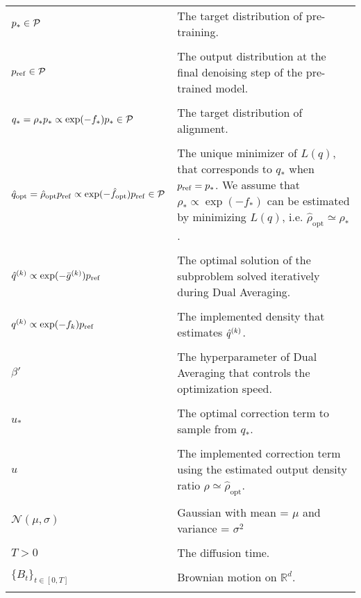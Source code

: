 \begin{longtable}{|>{\raggedright\arraybackslash}p{3cm}|>{\raggedright\arraybackslash}p{9cm}|}
$p_*\in{\mathcal{P}}$ & The target distribution of pre-training. \\ & \\ %
$p_{\rm{ref}} \in {\mathcal{P}}$ & The output distribution at the final denoising step of the pre-trained model. \\ & \\ %
$q_* = \rho_* p_* \propto \exp(-f_*) p_* \in {\mathcal{P}}$ & The target distribution of alignment. \\ & \\ %
$\hat{q}_{\mathrm{opt}} = \hat{\rho}_{\mathrm{opt}}p_{\rm{ref}} \propto \exp(-\hat{f}_\mathrm{opt})p_{\rm{ref}}\in {\mathcal{P}}$ & The unique minimizer of $L(q)$, that corresponds to $q_*$ when $p_{\rm{ref}}=p_*$. 
We assume that $\rho_* \propto \exp(-f_*)$ can be estimated by minimizing $L(q)$, i.e. $\hat{\rho}_\mathrm{opt} \simeq \rho_*$.
\\ & \\ 

$\hat{q}^{(k)} \propto \exp(-\bar{g}^{(k)})p_{\rm{ref}}$ & The optimal solution of the subproblem solved iteratively during Dual Averaging.  \\ & \\

$q^{(k)} \propto \exp(-f_{k})p_{\rm{ref}}$ & The implemented density that estimates $\hat{q}^{(k)}$. \\ & \\

$\beta'$ & The hyperparameter of Dual Averaging that controls the optimization speed. \\ & \\ %

$u_*$ & The optimal correction term to sample from $q_*$. \\ & \\


$u$ & The implemented correction term using the estimated output density ratio $\rho \simeq \hat{\rho}_\mathrm{opt}$. \\ & \\

$\mathcal{N}(\mu,\sigma)$ & Gaussian with mean = $\mu$ and variance = $\sigma^2$ \\ & \\ %

$T > 0$ & The diffusion time. \\ & \\ %
$\lbrace B_t \rbrace_{t\in[0,T]}$ & Brownian motion on $\mathbb{R}^d$. \\ & \\ %


\end{longtable}
